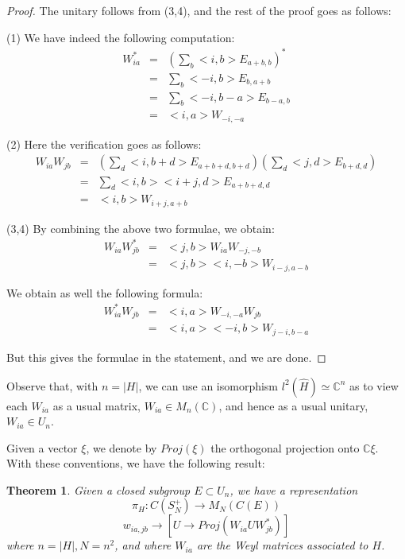 \documentclass[12pt]{amsbook}
\newtheorem{theorem}{Theorem}[chapter]
\begin{document}
\begin{proof}
The unitary follows from (3,4), and the rest of the proof goes as follows:

\medskip

(1) We have indeed the following computation:
\begin{eqnarray*}
W_{ia}^*
&=&\left(\sum_b<i,b>E_{a+b,b}\right)^*\\
&=&\sum_b<-i,b>E_{b,a+b}\\
&=&\sum_b<-i,b-a>E_{b-a,b}\\
&=&<i,a>W_{-i,-a}
\end{eqnarray*}

(2) Here the verification goes as follows:
\begin{eqnarray*}
W_{ia}W_{jb}
&=&\left(\sum_d<i,b+d>E_{a+b+d,b+d}\right)\left(\sum_d<j,d>E_{b+d,d}\right)\\
&=&\sum_d<i,b><i+j,d>E_{a+b+d,d}\\
&=&<i,b>W_{i+j,a+b}
\end{eqnarray*}

(3,4) By combining the above two formulae, we obtain:
\begin{eqnarray*}
W_{ia}W_{jb}^*
&=&<j,b>W_{ia}W_{-j,-b}\\
&=&<j,b><i,-b>W_{i-j,a-b}
\end{eqnarray*}

We obtain as well the following formula:
\begin{eqnarray*}
W_{ia}^*W_{jb}
&=&<i,a>W_{-i,-a}W_{jb}\\
&=&<i,a><-i,b>W_{j-i,b-a}
\end{eqnarray*}

But this gives the formulae in the statement, and we are done.
\end{proof}

Observe that, with $n=|H|$, we can use an isomorphism $l^2(\widehat{H})\simeq\mathbb C^n$ as to view each $W_{ia}$ as a usual matrix, $W_{ia}\in M_n(\mathbb C)$, and hence as a usual unitary, $W_{ia}\in U_n$. 

\bigskip

Given a vector $\xi$, we denote by $Proj(\xi)$ the orthogonal projection onto $\mathbb C\xi$. With these conventions, we have the following result:

\begin{theorem}
Given a closed subgroup $E\subset U_n$, we have a representation
$$\pi_H:C(S_N^+)\to M_N(C(E))$$
$$w_{ia,jb}\to[U\to Proj(W_{ia}UW_{jb}^*)]$$
where $n=|H|,N=n^2$, and where $W_{ia}$ are the Weyl matrices associated to $H$.
\end{theorem}
\end{document}
